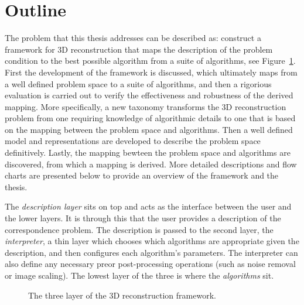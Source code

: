 
\section{Outline}
The problem that this thesis addresses can be described as: construct a framework for 3D reconstruction that maps the description of the problem condition to the best possible algorithm from a suite of algorithms, see Figure~\ref{fig:framework_overview}. First the development of the framework is discussed, which ultimately maps from a well defined problem space to a suite of algorithms, and then a rigorious evaluation is carried out to verify the effectiveness and robustness of the derived mapping. More specifically, a new taxonomy transforms the 3D reconstruction problem from one requiring knowledge of algorithmic details to one that is based on the mapping between the problem space and algorithms. Then a well defined model and representations are developed to describe the problem space definitively. Lastly, the mapping bewteen the problem space and algorithms are discovered, from which a mapping is derived. More detailed descriptions and flow charts are presented below to provide an overview of the framework and the thesis.

The \textit{description layer} sits on top and acts as the interface between the user and the lower layers. It is through this that the user provides a description of the correspondence problem. The description is passed to the second layer, the \textit{interpreter}, a thin layer which chooses which algorithms are appropriate given the description, and then configures each algorithm’s parameters. The interpreter can also define any necessary preor post-processing operations (such as noise removal or image scaling). The lowest layer of the three is where the \textit{algorithms} sit.
\begin{figure}[!htbp]
\centering
{}
\caption{The three layer of the 3D reconstruction framework.}
\label{fig:framework_overview}
\end{figure}

